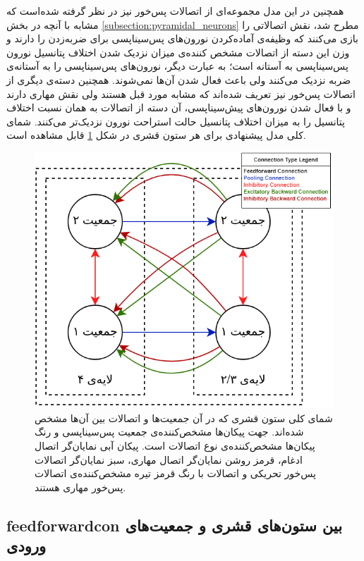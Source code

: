 \documentclass[12pt]{report}
\begin{document}
	همچنین در این مدل مجموعه‌ای از اتصالات پس‌خور نیز در نظر گرفته شده‌است که مشابه با آنچه در بخش \ref{subsection:pyramidal_neurons} مطرح شد، نقش اتصالاتی را بازی می‌کنند که وظیفه‌ی آماده‌کردن نورون‌های پس‌سیناپسی برای ضربه‌زدن را دارند و وزن این دسته از اتصالات مشخص کننده‌ی میزان نزدیک شدن اختلاف پتانسیل نورون پس‌سیناپسی به آستانه است؛ به عبارت دیگر، نورون‌های پس‌سیناپسی را به آستانه‌ی ضربه نزدیک می‌کنند ولی باعث فعال شدن آن‌ها نمی‌شوند. همچنین دسته‌ی دیگری از اتصالات پس‌خور نیز تعریف شده‌اند که مشابه مورد قبل هستند ولی نقش مهاری دارند و با فعال شدن نورون‌های پیش‌سیناپسی، آن دسته از اتصالات به همان نسبت اختلاف پتانسیل را به میزان اختلاف پتانسیل حالت استراحت نورون نزدیک‌تر می‌کنند.
		شمای کلی مدل پیشنهادی برای هر ستون قشری در شکل \ref{fig:model_cc} قابل مشاهده است. 
	
	\begin{figure}[]
		\centering
		\includegraphics[width=0.9\linewidth]{model_cc.png}
		\caption[NS]{
			شمای کلی ستون قشری که در آن جمعیت‌ها و اتصالات بین آن‌ها مشخص شده‌اند. جهت پیکان‌ها مشخص‌کننده‌ی جمعیت پس‌سیناپسی و رنگ پیکان‌ها مشخص‌کننده‌ی نوع اتصالات است. پیکان آبی نمایان‌گر اتصال ادغام، قرمز روشن نمایان‌گر اتصال مهاری، سبز نمایان‌گر اتصالات پس‌خور تحریکی و  اتصالات با رنگ قرمز تیره مشخص‌کننده‌ی اتصالات پس‌خور مهاری هستند.
		}
		\label{fig:model_cc} 
	\end{figure}
	
	
	\subsection{\gls{feedforwardcon} بین ستون‌های قشری و جمعیت‌های ورودی}
	
\end{document}
